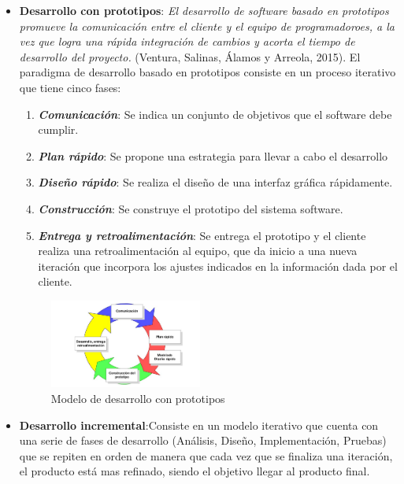 \begin{itemize}
    \item \textbf{Desarrollo con prototipos}: \textit{El desarrollo de software basado en prototipos promueve la comunicación entre el cliente
    y el equipo de programadoroes, a la vez que logra una rápida integración de cambios y acorta el tiempo de desarrollo del proyecto.}
    (Ventura, Salinas, Álamos y Arreola, 2015). El paradigma de desarrollo basado en prototipos consiste en un proceso iterativo que tiene cinco 
    fases:
    \begin{enumerate}
        \item \textbf{\textit{Comunicación}}: Se indica un conjunto de objetivos que el software debe cumplir.
        \item \textbf{\textit{Plan rápido}}: Se propone una estrategia para llevar a cabo el desarrollo
        \item \textbf{\textit{Diseño rápido}}: Se realiza el diseño de una interfaz gráfica rápidamente.
        \item \textbf{\textit{Construcción}}: Se construye el prototipo del sistema software.
        \item \textbf{\textit{Entrega y retroalimentación}}: Se entrega el prototipo y el cliente realiza una 
        retroalimentación al equipo, que da inicio a una nueva iteración que incorpora los ajustes indicados en la 
        información dada por el cliente.
    \end{enumerate}
    
    \begin{figure}[H]
        \centering
        \includegraphics[width=5cm]{Figures/modelo_prototipos.jpeg}
        \caption{Modelo de desarrollo con prototipos}
    \end{figure}

    \item \textbf{Desarrollo incremental}:Consiste en un modelo iterativo que cuenta con una serie de fases de desarrollo
    (Análisis, Diseño, Implementación, Pruebas) que se repiten en orden de manera que cada vez que se finaliza una iteración, 
    el producto está mas refinado, siendo el objetivo llegar al producto final.


\end{itemize}
